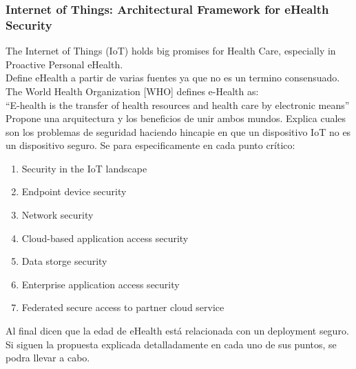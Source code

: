\subsubsection{Internet of Things: Architectural Framework	for eHealth Security}\cite{Paper8}
The Internet of Things (IoT) holds big promises for Health Care, especially in Proactive Personal eHealth.\\
Define eHealth a partir de varias fuentes ya que no es un termino consensuado.
The World Health Organization [WHO] defines e-Health as:\\
``E-health is the transfer of health resources and health care by electronic means''
Propone una arquitectura y los beneficios de unir ambos mundos. Explica cuales son los problemas de seguridad haciendo hincapie en que un dispositivo IoT no es un dispositivo seguro. Se para especificamente en cada punto crítico:
\begin{enumerate}
	\item Security in the IoT landscape
	\item Endpoint device security
	\item Network security
	\item Cloud-based application access security
	\item Data storge security
	\item Enterprise application access security
	\item Federated secure access to partner cloud service
\end{enumerate}
Al final dicen que la edad de eHealth está relacionada con un deployment seguro. Si siguen la propuesta explicada detalladamente en cada uno de sus puntos, se podra llevar a cabo.


